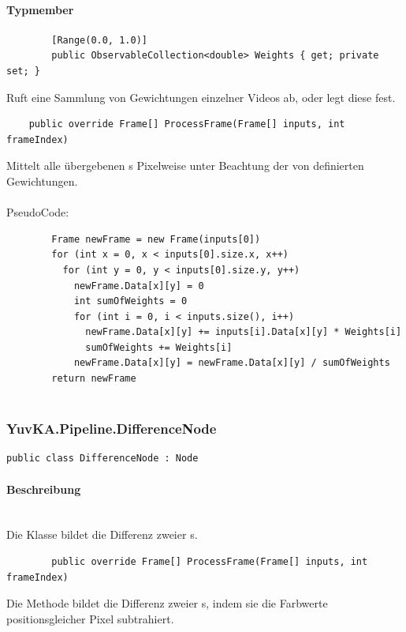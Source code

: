 \paragraph{Typmember}
\begin{itemize}

	\begin{verbatim}
		[Range(0.0, 1.0)]
		public ObservableCollection<double> Weights { get; private set; }
	\end{verbatim}
	Ruft eine Sammlung von Gewichtungen einzelner Videos ab, oder legt diese fest.

	\begin{verbatim}
	public override Frame[] ProcessFrame(Frame[] inputs, int frameIndex)
	\end{verbatim}
	Mittelt alle übergebenen s Pixelweise unter Beachtung der von  definierten Gewichtungen.\\~\\
	PseudoCode:
	\begin{verbatim}
		Frame newFrame = new Frame(inputs[0])
		for (int x = 0, x < inputs[0].size.x, x++)
		  for (int y = 0, y < inputs[0].size.y, y++)
		    newFrame.Data[x][y] = 0
		    int sumOfWeights = 0
		    for (int i = 0, i < inputs.size(), i++)
		      newFrame.Data[x][y] += inputs[i].Data[x][y] * Weights[i]
		      sumOfWeights += Weights[i]
		    newFrame.Data[x][y] = newFrame.Data[x][y] / sumOfWeights
		return newFrame
		
	\end{verbatim}
	
\end{itemize}

\subsubsection{YuvKA.Pipeline.DifferenceNode}

\begin{verbatim}
public class DifferenceNode : Node
\end{verbatim}

\paragraph{Beschreibung}~\\
Die Klasse  bildet die Differenz zweier s.

\begin{itemize}
	\begin{verbatim}
		public override Frame[] ProcessFrame(Frame[] inputs, int frameIndex)
	\end{verbatim}
Die Methode  bildet die Differenz zweier s, indem sie die Farbwerte positionsgleicher Pixel subtrahiert.

\end{itemize}

